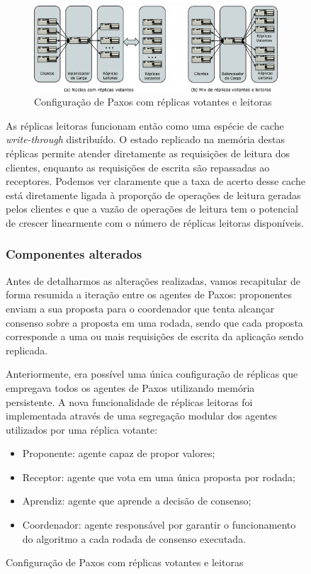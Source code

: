 \begin{figure}[ht]
\begin{figure}[ht]
  \begin{center}
    \includegraphics[width=16cm]{conteudo/capitulos/figuras/configuracao_replicas_leitoras.eps}
  \end{center}
  \caption{Configuração de Paxos com réplicas votantes e leitoras}
  \label{fig:configuracao_replicas_leitoras}
\end{figure}

As réplicas leitoras funcionam então como uma espécie de cache \emph{write-through}
distribuído. O estado replicado na memória destas réplicas permite atender diretamente as
requisições de leitura dos clientes, enquanto as requisições de escrita são repassadas ao
receptores. Podemos ver claramente que a taxa de acerto desse cache está diretamente
ligada à proporção de operações de leitura geradas pelos clientes e que a vazão de
operações de leitura tem o potencial de crescer linearmente com o número de réplicas
leitoras disponíveis.

\subsubsection{Componentes alterados}

Antes de detalharmos as alterações realizadas, vamos recapitular de forma resumida a
iteração entre os agentes de Paxos: proponentes enviam a sua proposta para o coordenador
que tenta alcançar consenso sobre a proposta em uma rodada, sendo que cada proposta
corresponde a uma ou mais requisições de escrita da aplicação sendo replicada.

Anteriormente, era possível uma única configuração de réplicas que empregava todos os
agentes de Paxos utilizando memória persistente. A nova funcionalidade de réplicas
leitoras foi implementada através de uma segregação modular dos agentes utilizados por uma
réplica votante:

\begin{itemize}
  \item Proponente: agente capaz de propor valores;
  \item Receptor: agente que vota em uma única proposta por rodada;
  \item Aprendiz: agente que aprende a decisão de consenso;
  \item Coordenador: agente responsável por garantir o funcionamento do algoritmo a cada
    rodada de consenso executada.
\end{itemize}


\end{figure}
